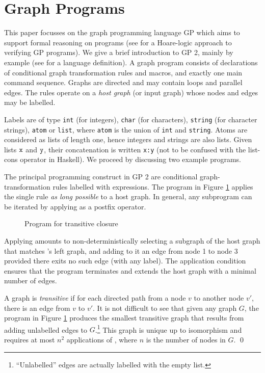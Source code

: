 \section{Graph Programs}
\label{sec:graph-programs}

This paper focusses on the graph programming language GP \cite{Plump09a,Plump12a} which aims to support formal reasoning on programs (see \cite{Poskitt-Plump12a} for a Hoare-logic approach to verifying GP programs). We give a brief introduction to GP 2, mainly by example (see \cite{Plump12a} for a language definition). A graph program consists of declarations of conditional graph transformation rules and macros, and exactly one main command sequence. Graphs are directed and may contain  loops and parallel edges. The rules operate on a \emph{host graph}\/ (or input graph) whose nodes and edges may be labelled.

Labels are of type \texttt{int} (for integers), \texttt{char} (for characters), \texttt{string} (for character strings), \texttt{atom} or \texttt{list}, where \texttt{atom} is the union of \texttt{int} and \texttt{string}. Atoms are considered as lists of length one, hence integers and strings are also lists. Given lists $\mathtt{x}$ and $\mathtt{y}$, their concatenation is written \texttt{x:y} (not to be confused with the list-cons operator in Haskell). 
We proceed by discussing two example programs.

\begin{example}
The principal programming construct in GP 2 are conditional graph-transformation rules labelled with expressions. The program in Figure \ref{fig:transitive-closure} applies the single rule  \emph{as long possible} to a host graph. In general, any subprogram can be iterated by applying \ttt{!} as a postfix operator.

\begin{figure}[htb]
\begin{center}
 
\end{center}
\caption{Program for transitive closure}\label{fig:transitive-closure}
\end{figure}

Applying  amounts to non-deterministically selecting a subgraph of the host graph that matches 's left graph, and adding to it an edge from node 1 to node 3 provided there exits no such edge (with any label). The application condition ensures that the program terminates and extends the host graph with a minimal number of edges.

A graph is \emph{transitive} if for each directed path from a node $v$ to another node $v'$, there is an edge from $v$ to $v'$. It is not difficult to see that given any graph $G$, the program in Figure \ref{fig:transitive-closure} produces the smallest transitive graph that results from adding unlabelled edges to $G$.\footnote{``Unlabelled'' edges are actually labelled with the empty list.} This graph is unique up to isomorphism and requires at most $n^2$ applications of , where $n$\/ is the number of nodes in $G$. \qed
\end{example}
  

